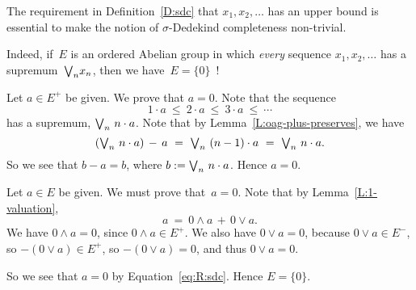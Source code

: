 \documentclass[main.tex]{subfiles}
\begin{document}
\begin{rem}
The requirement
in Definition~\ref{D:sdc}
 that $x_1,x_2,\dotsc$
has an upper bound 
is essential
to make the notion
of $\sigma$-Dedekind completeness non-trivial.

Indeed,
if~$E$ is an ordered Abelian group
in which \emph{every} sequence $x_1,x_2,\dotsc$ has a supremum~$\textstyle{\bigvee}_n x_n$,
then we have~$E=\{0\}$~!

Let $a\in E^+$ be given. We prove that $a=0$.
Note that the sequence
\begin{equation*}
1\cdot a  \ \leq\ 2\cdot a \ \leq\  3\cdot a \ \leq\ \dotsb
\end{equation*}
has a supremum, $\textstyle{\bigvee}_n \ n\cdot a$.
Note that by Lemma~\ref{L:oag-plus-preserves}, we have
\begin{equation*}
(\bv_n\ n\cdot a)\,-\,a\ =\ 
\bv_n \ (n-1) \cdot a \ = \ 
\bv_n\ n\cdot a.
\end{equation*}
So we see that $b-a = b$,
where $b:= \textstyle{\bigvee}_n \ n\cdot a$.
Hence $a=0$.

Let $a\in E$ be given.
We must prove that~$a=0$.
Note that
by Lemma~\ref{L:1-valuation},
\begin{equation}
\label{eq:R:sdc}
a\ = \ 0\wedge a \,+\, 0\vee a.
\end{equation}
We have $0\wedge a =0$,
since $0\wedge a \in E^+$.
We also have $0\vee a=0$,
because $0\vee a\in E^-$,
so $-(0\vee a)\in E^+$, so $-(0\vee a)=0$,
and thus $0\vee a=0$.

So we see that $a=0$ by Equation~\eqref{eq:R:sdc}.
Hence $E=\{0\}$.
\end{rem}
\end{document}
